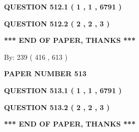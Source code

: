 \documentclass[12pt]{article}
\begin{document}
\vspace{0.2in}
  
{\textbf{\Large{QUESTION
512.1 
 ( 1 , 1 , 6791 )
}}}
  
  
  
\vspace{0.2in}
  
{\textbf{\Large{QUESTION
512.2 
 ( 2 , 2 , 3 )
}}}
  
  
   
   
 \vspace{0.2in}
 
   
   
   
   
\vspace{1.0in} 
{\textbf{\large{ *** END OF PAPER, THANKS *** }}} 
   
   
\hspace{1.0in} By: 
 239 ( 416 ,  613 )
   
   
   
   
\newpage 
\setcounter{page}{ 
   513001 } 
   
   
   
   
 {\textbf{ \Large{ PAPER NUMBER  513  }}}
   
   
\vspace{0.2in}
   
   
   
   
   
   
 \vspace{0.2in}
 
 
 
 
   
   
  
\vspace{0.2in}
  
{\textbf{\Large{QUESTION
513.1 
 ( 1 , 1 , 6791 )
}}}
  
  
  
\vspace{0.2in}
  
{\textbf{\Large{QUESTION
513.2 
 ( 2 , 2 , 3 )
}}}
  
  
   
   
 \vspace{0.2in}
 
   
   
   
   
\vspace{1.0in} 
{\textbf{\large{ *** END OF PAPER, THANKS *** }}} 
   
\end{document}
